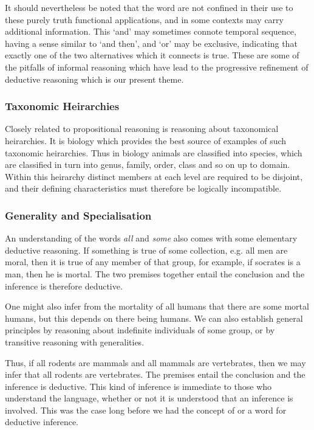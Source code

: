 \documentclass[10pt,titlepage]{book}
\begin{document}
It should nevertheless be noted that the word are not confined in their use to these purely truth functional applications, and in some contexts may carry additional information.
This `and' may sometimes connote temporal sequence, having a sense similar to `and then', and `or' may be exclusive, indicating that exactly one of the two alternatives which it connects is true.
These are some of the pitfalls of informal reasoning which have lead to the progressive refinement of deductive reasoning which is our present theme.

\subsubsection{Taxonomic Heirarchies}

Closely related to propositional reasoning is reasoning about taxonomical heirarchies.
It is biology which provides the best source of examples of such taxonomic heirarchies.
Thus in biology animals are classified into species, which are classified in turn into genus, family, order, class and so on up to domain.
Within this heirarchy distinct members at each level are required to be disjoint, and their defining characteristics must therefore be logically incompatible.

\subsubsection{Generality and Specialisation}

An understanding of the words \emph{all} and \emph{some} also comes with some elementary deductive reasoning.
If something is true of some collection, e.g. all men are moral, then it is true of any member of that group, for example, if socrates is a man, then he is mortal.
The two premises together entail the conclusion and the inference is therefore deductive.

One might also infer from the mortality of all humans that there are some mortal humans, but this depends on there being humans.
We can also establish general principles by reasoning about indefinite individuals of some group, or by transitive reasoning with generalities.

Thus, if all rodents are mammals and all mammals are vertebrates, then we may infer that all rodents are vertebrates.
The premises entail the conclusion and the inference is deductive.
This kind of inference is immediate to those who understand the language, whether or not it is understood that an inference is involved.
This was the case long before we had the concept of or a word for deductive inference.
\end{document}
